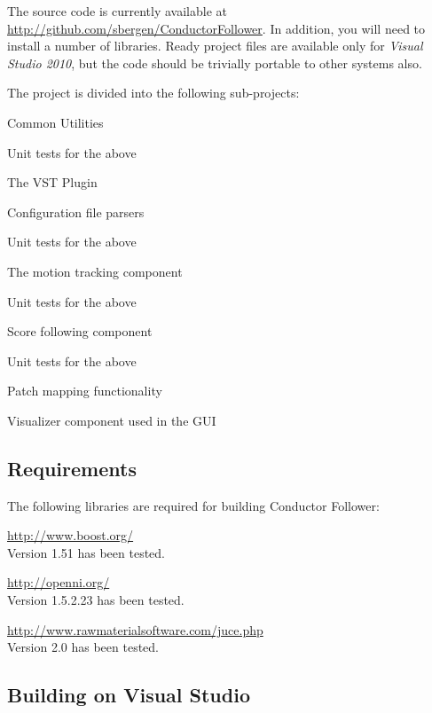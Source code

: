 \documentclass[12pt,a4paper]{article}
\newcommand{\CF}{Conductor Follower}
\begin{document}
The source code is currently available at
\url{http://github.com/sbergen/ConductorFollower}.
In addition, you will need to install a number of libraries.
Ready project files are available only for \textit{Visual Studio 2010},
but the code should be trivially portable to other systems also.

\newcommand{\utfta}{Unit tests for the above}
The project is divided into the following sub-projects:
\begin{description}[leftmargin=32ex]
\item[cf] Common Utilities
\item[cfTests] \utfta
\item[CFPlugin] The VST Plugin
\item[Data] Configuration file parsers
\item[DataTests] \utfta
\item[MotionTracker] The motion tracking component
\item[MotionTrackerTests] \utfta
\item[ScoreFollower] Score following component
\item[ScoreFollowerTests] \utfta
\item[PatchMapper] Patch mapping functionality
\item[Visualizer] Visualizer component used in the GUI
\end{description}

\subsection{Requirements}

The following libraries are required for building \CF{}:
\begin{description}[leftmargin=12ex]
\item[Boost:] \url{http://www.boost.org/}
\\Version 1.51 has been tested.
\item[OpenNI:] \url{http://openni.org/}
\\Version 1.5.2.23 has been tested.
\item[Juce:] \url{http://www.rawmaterialsoftware.com/juce.php}
\\Version 2.0 has been tested.
\end{description}

\subsection{Building on Visual Studio}
\end{document}
